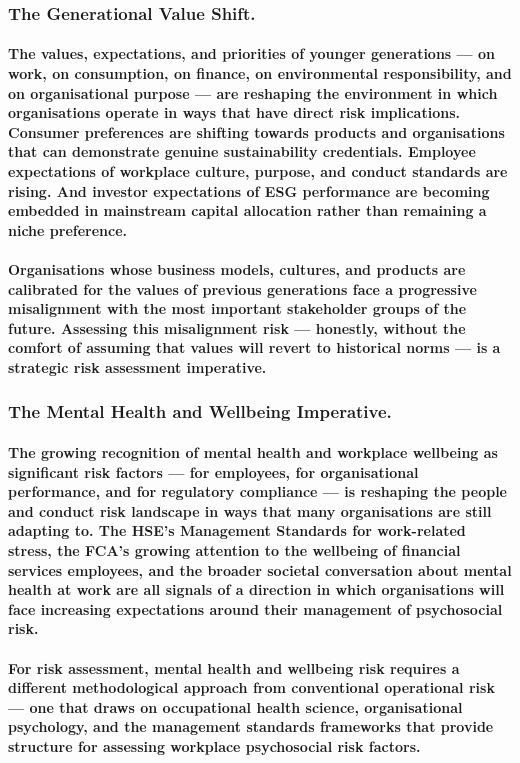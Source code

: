 \subsubsection{The Generational Value Shift.}
\paragraph{The values, expectations, and priorities of younger generations — on work, on consumption, on finance, on environmental responsibility, and on organisational purpose — are reshaping the environment in which organisations operate in ways that have direct risk implications. Consumer preferences are shifting towards products and organisations that can demonstrate genuine sustainability credentials. Employee expectations of workplace culture, purpose, and conduct standards are rising. And investor expectations of ESG performance are becoming embedded in mainstream capital allocation rather than remaining a niche preference.}
\paragraph{Organisations whose business models, cultures, and products are calibrated for the values of previous generations face a progressive misalignment with the most important stakeholder groups of the future. Assessing this misalignment risk — honestly, without the comfort of assuming that values will revert to historical norms — is a strategic risk assessment imperative.}
\subsubsection{The Mental Health and Wellbeing Imperative.}
\paragraph{The growing recognition of mental health and workplace wellbeing as significant risk factors — for employees, for organisational performance, and for regulatory compliance — is reshaping the people and conduct risk landscape in ways that many organisations are still adapting to. The HSE's Management Standards for work-related stress, the FCA's growing attention to the wellbeing of financial services employees, and the broader societal conversation about mental health at work are all signals of a direction in which organisations will face increasing expectations around their management of psychosocial risk.}
\paragraph{For risk assessment, mental health and wellbeing risk requires a different methodological approach from conventional operational risk — one that draws on occupational health science, organisational psychology, and the management standards frameworks that provide structure for assessing workplace psychosocial risk factors.}

